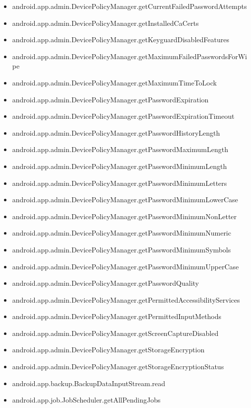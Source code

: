 \documentclass{sig-alternate}
\begin{document}
\begin{itemize}
\item android.app.admin.DevicePolicyManager.getCurrentFailedPasswordAttempts
\item android.app.admin.DevicePolicyManager.getInstalledCaCerts
\item android.app.admin.DevicePolicyManager.getKeyguardDisabledFeatures
\item android.app.admin.DevicePolicyManager.getMaximumFailedPasswordsForWipe
\item android.app.admin.DevicePolicyManager.getMaximumTimeToLock
\item android.app.admin.DevicePolicyManager.getPasswordExpiration
\item android.app.admin.DevicePolicyManager.getPasswordExpirationTimeout
\item android.app.admin.DevicePolicyManager.getPasswordHistoryLength
\item android.app.admin.DevicePolicyManager.getPasswordMaximumLength
\item android.app.admin.DevicePolicyManager.getPasswordMinimumLength
\item android.app.admin.DevicePolicyManager.getPasswordMinimumLetters
\item android.app.admin.DevicePolicyManager.getPasswordMinimumLowerCase
\item android.app.admin.DevicePolicyManager.getPasswordMinimumNonLetter
\item android.app.admin.DevicePolicyManager.getPasswordMinimumNumeric
\item android.app.admin.DevicePolicyManager.getPasswordMinimumSymbols
\item android.app.admin.DevicePolicyManager.getPasswordMinimumUpperCase
\item android.app.admin.DevicePolicyManager.getPasswordQuality
\item android.app.admin.DevicePolicyManager.getPermittedAccessibilityServices
\item android.app.admin.DevicePolicyManager.getPermittedInputMethods
\item android.app.admin.DevicePolicyManager.getScreenCaptureDisabled
\item android.app.admin.DevicePolicyManager.getStorageEncryption
\item android.app.admin.DevicePolicyManager.getStorageEncryptionStatus
\item android.app.backup.BackupDataInputStream.read
\item android.app.job.JobScheduler.getAllPendingJobs

\end{itemize}
\end{document}
